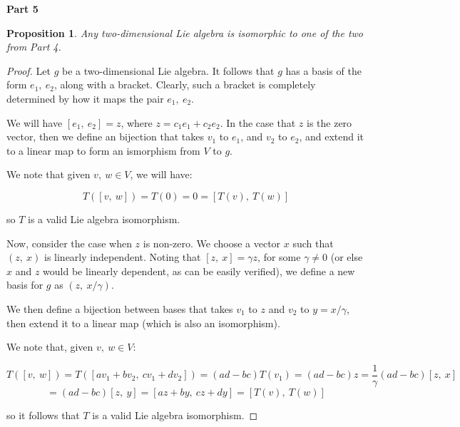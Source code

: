 \documentclass[10pt, oneside]{article}
\newtheorem{prop}{Proposition}
\begin{document}
    \textbf{Part 5}
    \newline

    \begin{prop}
      Any two-dimensional Lie algebra is isomorphic to one of the two from Part 4.
    \end{prop}

    \begin{proof}
      Let $g$ be a two-dimensional Lie algebra. It follows that $g$ has a basis of the form $e_1, \ e_2$, along
      with a bracket. Clearly, such a bracket is completely determined by how it maps the pair $e_1, \ e_2$.
      \newline

      We will have $[e_1, \ e_2] = z$, where $z = c_1 e_1 + c_2 e_2$. In the case that $z$ is the zero vector, then
      we define an bijection that takes $v_1$ to $e_1$, and $v_2$ to $e_2$, and extend it to a linear map to form
      an ismorphism from $V$ to $g$.
      \newline

      We note that given $v, \ w \in V$, we will have:

      $$T([v, \ w]) = T(0) = 0 = [T(v), \ T(w)]$$

      so $T$ is a valid Lie algebra isomorphism.
      \newline

      Now, consider the case when $z$ is non-zero. We choose a vector $x$ such that $(z, \ x)$ is linearly independent. Noting that $[z, \ x] = \gamma z$,
      for some $\gamma \neq 0$ (or else $x$ and $z$ would be linearly dependent, as can be easily verified), we define a new basis for $g$ as $(z, \ x/\gamma)$.
      \newline

      We then
      define a bijection between bases that takes $v_1$ to $z$ and $v_2$ to $y = x/\gamma$, then extend it to a linear map (which is
      also an isomorphism).
      \newline

      We note that, given $v, \ w \in V$:

      $$T([v, \ w]) = T([av_1 + bv_2, \ cv_1 + dv_2]) = (ad - bc)T(v_1) = (ad - bc)z = \frac{1}{\gamma}(ad - bc)[z, \ x]$$
      $$= (ad - bc)[z, \ y] = [az + by, \ cz + dy] = [T(v), \ T(w)]$$

      so it follows that $T$ is a valid Lie algebra isomorphism.

    \end{proof}
\end{document}
